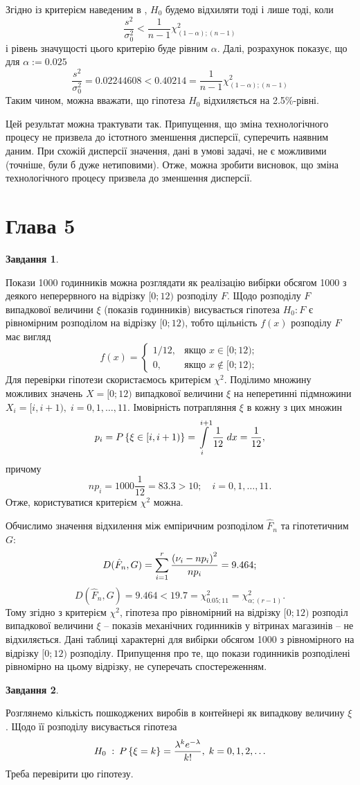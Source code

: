 \documentclass[12pt]{article} %
\newtheorem{prob}{Завдання}
\begin{document}
	Згідно із критерієм наведеним в \cite[4.3]{turchin}, $H_0$ будемо відхиляти тоді і лише тоді, коли
	\[\frac{s^2}{\sigma_0^2}<\frac{1}{n-1}\chi^2_{(1-\alpha);(n-1)}\]
	і рівень значущості цього критерію буде рівним $\alpha$. Далі, розрахунок показує, що для $\alpha:=0.025$
	\[\frac{s^2}{\sigma_0^2}=0.02244608<0.40214=\frac{1}{n-1}\chi^2_{(1-\alpha);(n-1)}\]
	Таким чином, можна вважати, що гіпотеза $H_0$ відхиляється на 2.5\%-рівні.

	Цей результат можна трактувати так. Припущення, що зміна технологічного процесу не призвела до істотного зменшення дисперсії, суперечить
	наявним даним. При схожій дисперсії значення, дані в умові задачі, не є можливими (точніше, були б дуже нетиповими). Отже, можна зробити
	висновок, що зміна технологічного процесу призвела до зменшення дисперсії.
\section{Глава 5}
\setcounter{prob}{40}
\begin{prob}\end{prob}
	Покази 1000 годинників можна розглядати як реалізацію вибірки обсягом 1000 з деякого неперервного на відрізку $[0;12)$ розподілу $F$. Щодо
	розподілу $F$ випадкової величини $\xi$ (показів годинників) висувається гіпотеза $H_0:F$ є рівномірним розподілом на відрізку $[0;12)$,
	тобто щільність $f(x)$ розподілу $F$ має вигляд
	\[f(x)=\left\{\begin{array}{cr}1/12,&\mbox{якщо }x\in[0;12);\\0,&\mbox{якщо }x\notin[0;12);\end{array}\right.\]
	Для перевірки гіпотези скористаємось критерієм $\chi^2$. Поділимо множину можливих значень $X=[0;12)$ випадкової величини $\xi$ на
	неперетинні підмножини $X_i=[i,i+1),\;i=0,1,\hdots,11$. Імовірність потрапляння $\xi$ в кожну з цих множин
	\[p_i=P\mycbra{\xi\in[i,i+1)}=\int_i^{i+1}\frac{1}{12}\;dx=\frac{1}{12},\]
	причому
	\[np_i=1000\frac{1}{12}=83.3>10;\quad i=0,1,\hdots,11.\]
	Отже, користуватися критерієм $\chi^2$ можна.

	Обчислимо значення відхилення між емпіричним розподілом $\hat{F}_n$ та гіпотетичним $G$:
	\[D(\hat{F}_n,G)=\sum_{i=1}^r\frac{\mybra{\nu_i-np_i}^2}{np_i}=9.464;\]
	\[D(\hat{F}_n,G)=9.464<19.7=\chi_{0.05;11}^2=\chi^2_{\alpha;(r-1)}.\]
	Тому згідно з критерієм $\chi^2$, гіпотеза про рівномірний на відрізку $[0;12)$ розподіл випадкової величини $\xi$ -- показів механічних
	годинників у вітринах магазинів -- не відхиляється. Дані таблиці характерні для вибірки обсягом 1000 з рівномірного на відрізку $[0;12)$
	розподілу. Припущення про те, що покази годинників розподілені рівномірно на цьому відрізку, не суперечать спостереженням.
\begin{prob}\end{prob}
	Розглянемо кількість пошкоджених виробів в контейнері як випадкову величину $\xi$. Щодо її розподілу висувається гіпотеза
	\[H_0\;:\:P\left\{\xi=k\right\}=\frac{\lambda^ke^{-\lambda}}{k!},\;k=0,1,2,\hdots\]
	Треба перевірити цю гіпотезу.
\end{document}
